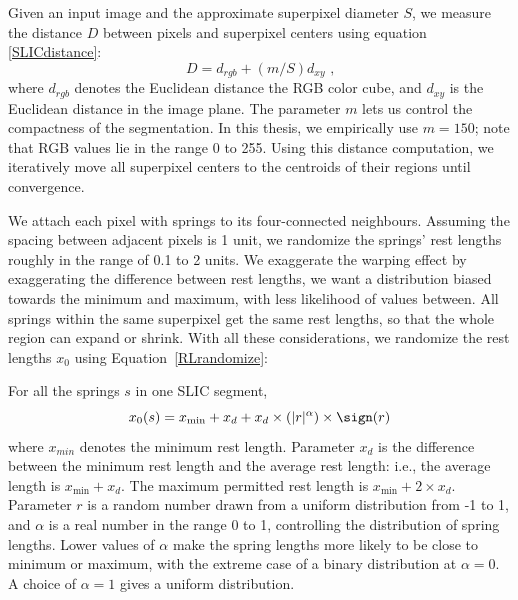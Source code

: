 Given an input image and the approximate superpixel diameter $S$, we measure the distance $D$ between pixels and superpixel centers using equation \eqref{SLICdistance}:
 \begin{equation} \label{SLICdistance}
D = d_{rgb} + (m/S)d_{xy} \text{ ,}
\end{equation}
where $d_{rgb}$ denotes the Euclidean distance the RGB color cube, and $d_{xy}$ is the Euclidean distance in the image plane. The parameter $m$ lets us control the compactness of the segmentation. In this thesis, we empirically use $m=150$; note that RGB values lie in the range 0 to 255. Using this
distance computation, we iteratively move all superpixel centers to the centroids of their regions until convergence.

We attach each pixel with springs to its four-connected neighbours. Assuming the spacing between adjacent pixels is 1 unit, we randomize the springs' rest lengths roughly in the range of 0.1 to 2 units. We exaggerate the warping effect by exaggerating the difference between rest lengths, we want a distribution biased towards the minimum and maximum, with less likelihood of values between. All springs within the same superpixel get the same rest lengths, so that the whole region can expand or shrink. With all these considerations, we randomize the rest lengths $x_0$ using Equation~\eqref{RLrandomize}:

For all the springs $s$ in one SLIC segment,
\begin{equation} \label{RLrandomize}
	 x_0(s) =
  	 x_{\min} + x_{d} + x_{d} \times (|r|^\alpha) \times \sign(r)  
\end{equation}
where $x_{min}$ denotes the minimum rest length. Parameter $x_{d}$ is the difference between the minimum rest length and the average rest length: i.e.,  the average length is $x_{\min}+x_{d}$. The maximum permitted rest length is $x_{\min}+2 \times x_{d}$. Parameter $r$ is a random number drawn from a uniform distribution from -1 to 1, and $\alpha$ is a real number in the range 0 to 1, controlling the distribution of spring lengths. Lower values of $\alpha$  make the spring lengths more likely to be close to minimum or maximum, with the extreme case of a binary distribution at $\alpha=0$. A choice of $\alpha=1$ gives a uniform distribution.

